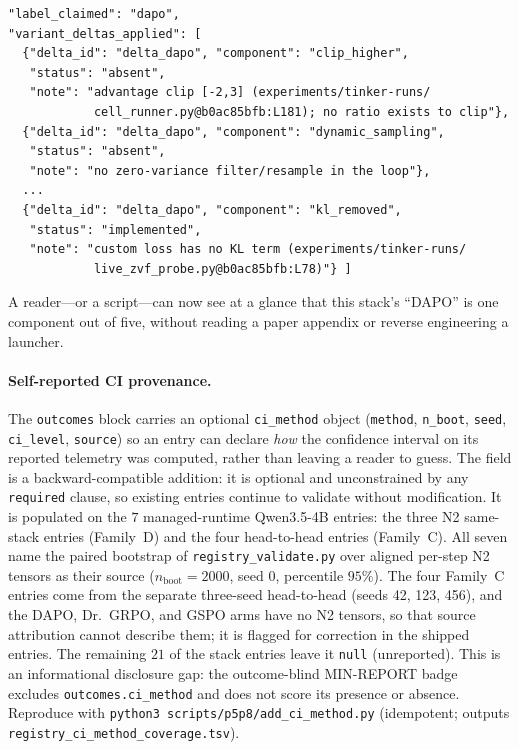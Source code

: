 \begin{lstlisting}[basicstyle=\ttfamily\scriptsize, frame=single,
  caption={Excerpt from \texttt{entries/tinker_dapo_qwen3.5-4b_gsm8k.json}
  (two of five components elided).},
  label={lst:p6-dapo-entry}]
"label_claimed": "dapo",
"variant_deltas_applied": [
  {"delta_id": "delta_dapo", "component": "clip_higher",
   "status": "absent",
   "note": "advantage clip [-2,3] (experiments/tinker-runs/
            cell_runner.py@b0ac85bfb:L181); no ratio exists to clip"},
  {"delta_id": "delta_dapo", "component": "dynamic_sampling",
   "status": "absent",
   "note": "no zero-variance filter/resample in the loop"},
  ...
  {"delta_id": "delta_dapo", "component": "kl_removed",
   "status": "implemented",
   "note": "custom loss has no KL term (experiments/tinker-runs/
            live_zvf_probe.py@b0ac85bfb:L78)"} ]
\end{lstlisting}

A reader---or a script---can now see at a glance that this stack's ``DAPO'' is
one component out of five, without reading a paper appendix or reverse
engineering a launcher.

\paragraph{Self-reported CI provenance.} The \texttt{outcomes} block carries
an optional \texttt{ci\_method} object (\texttt{method}, \texttt{n\_boot},
\texttt{seed}, \texttt{ci\_level}, \texttt{source}) so an entry can declare
\emph{how} the confidence interval on its reported telemetry was computed,
rather than leaving a reader to guess. The field is a backward-compatible
addition: it is optional and unconstrained by any \texttt{required} clause, so
existing entries continue to validate without modification. It is populated on
the $7$ managed-runtime Qwen3.5-4B entries: the three N2 same-stack entries
(Family~D) and the four head-to-head entries (Family~C). All seven name the
paired bootstrap of \texttt{registry\_validate.py} over aligned per-step N2
tensors as their source ($n_{\text{boot}}{=}2000$, seed $0$, percentile
$95\%$). The four Family~C entries come from the separate three-seed
head-to-head (seeds 42, 123, 456), and the DAPO, Dr.~GRPO, and GSPO arms have
no N2 tensors, so that source attribution cannot describe them; it is flagged
for correction in the shipped entries. The remaining $21$ of the
\NSTACK{} stack entries leave it \texttt{null} (unreported). This is an
informational disclosure gap: the outcome-blind MIN-REPORT badge excludes
\texttt{outcomes.ci\_method} and does not score its presence or absence.
Reproduce with \texttt{python3 scripts/p5p8/add\_ci\_method.py} (idempotent;
outputs \texttt{registry\_ci\_method\_coverage.tsv}).
